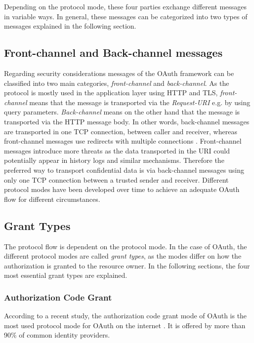 Depending on the protocol mode, these four parties exchange different messages in variable ways. In general, these messages can be categorized into two types of messages explained in the following section.

\subsection{Front-channel and Back-channel messages}

Regarding security considerations messages of the OAuth framework can be classified into two main categories, \emph{front-channel} and
\emph{back-channel}. As the protocol is mostly used in the application layer using HTTP and TLS, \emph{front-channel} means that the message is transported via the \emph{Request-URI} \cite{fielding1999rfc2616} e.g. by using query parameters. \emph{Back-channel} means on the other hand that the message is transported via the HTTP message body. In other words, back-channel
messages are transported in one TCP connection, between caller and receiver, whereas front-channel messages use redirects with multiple connections \cite{belfaik2022single}. Front-channel messages introduce more threats as the data transported in the URI could potentially appear in history logs and similar mechanisms. Therefore the preferred way to transport confidential data is via back-channel messages using only one TCP connection between a trusted sender and receiver. Different protocol modes have been developed over time to achieve an adequate OAuth flow for different circumstances.

\subsection{Grant Types}
The protocol flow is dependent on the protocol mode. In the case of OAuth, the different protocol modes are called \emph{grant types}, as the modes differ on how the authorization is granted to the resource owner. In the following sections, the four most essential grant types are explained.

\subsubsection{Authorization Code Grant}
According to a recent study, the authorization code grant mode of OAuth is the most used protocol mode for OAuth on the internet
\cite{philippaerts2022oauch}. It is offered by more than 90\% of common identity providers.

